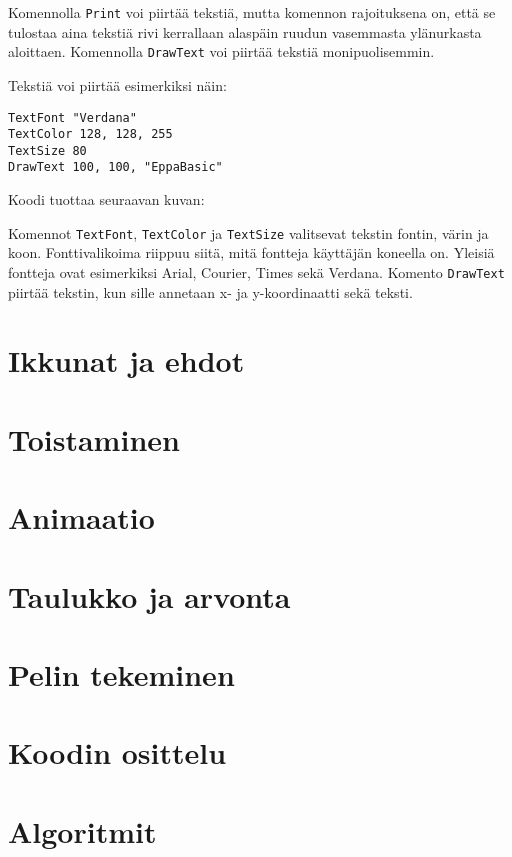\documentclass[oneside,11pt,a4paper,finnish]{book}
\begin{document}
Komennolla \texttt{Print} voi piirtää
tekstiä, mutta komennon rajoituksena on,
että se tulostaa aina tekstiä rivi kerrallaan alaspäin
ruudun vasemmasta ylänurkasta aloittaen.
Komennolla \texttt{DrawText} voi piirtää
tekstiä monipuolisemmin.

Tekstiä voi piirtää esimerkiksi näin:

\begin{verbatim}
TextFont "Verdana"
TextColor 128, 128, 255
TextSize 80
DrawText 100, 100, "EppaBasic"
\end{verbatim}

\newpage
Koodi tuottaa seuraavan kuvan:


Komennot \texttt{TextFont},
\texttt{TextColor} ja \texttt{TextSize}
valitsevat tekstin fontin, värin ja koon.
Fonttivalikoima riippuu siitä,
mitä fontteja käyttäjän koneella on.
Yleisiä fontteja ovat esimerkiksi
Arial, Courier, Times sekä Verdana.
Komento \texttt{DrawText}
piirtää tekstin, kun sille annetaan
x- ja y-koordinaatti sekä teksti.



\chapter{Ikkunat ja ehdot}

\chapter{Toistaminen}

\chapter{Animaatio}

\chapter{Taulukko ja arvonta}

\chapter{Pelin tekeminen}


\chapter{Koodin osittelu}

\chapter{Algoritmit}
\end{document}
